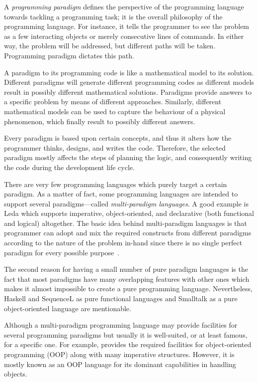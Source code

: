 	A \textit{programming paradigm} defines the perspective of the programming language towards tackling a programming task; it is the overall philosophy of the programming language. For instance, it tells the programmer to see the problem as a few interacting objects or merely consecutive lines of commands. In either way, the problem will be addressed, but different paths will be taken. Programming paradigm dictates this path.
	
	A paradigm to its programming code is like a mathematical model to its solution. Different paradigms will generate different programming codes as different models result in possibly different mathematical solutions. Paradigms provide answers to a specific problem by means of different approaches. Similarly, different mathematical models can be used to capture the behaviour of a physical phenomenon, which finally result to possibly different answers. 
	
	Every paradigm is based upon certain concepts, and thus it alters how the programmer thinks, designs, and writes the code. Therefore, the selected paradigm mostly affects the steps of planning the logic, and consequently writing the code during the development life cycle.
			
	There are very few programming languages which purely target a certain paradigm. As a matter of fact, some programming languages are intended to support several paradigms---called \textit{multi-paradigm languages}. A good example is Leda which supports imperative, object-oriented, and declarative (both functional and logical) altogether. The basic idea behind multi-paradigm languages is that programmer can adopt and mix the required constructs from different paradigms according to the nature of the problem in-hand since there is no single perfect paradigm for every possible purpose~\autocite{Budd.1995}.
	
	The second reason for having a small number of pure paradigm languages is the fact that most paradigms have many overlapping features with other ones which makes it almost impossible to create a pure programming language. Nevertheless, Haskell and SequenceL as pure functional languages and Smalltalk as a pure object-oriented language are mentionable.
	
	Although a multi-paradigm programming language may provide facilities for several programming paradigms but usually it is well-suited, or at least famous, for a specific one. For example, \py{} provides the required facilities for object-oriented programming (OOP) along with many imperative structures. However, it is mostly known as an OOP language for its dominant capabilities in handling objects.
		
